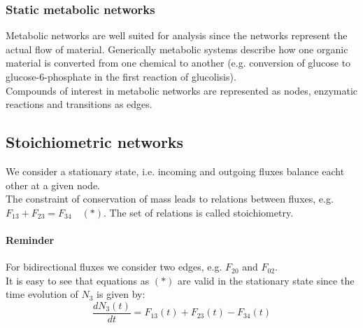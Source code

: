 \subsubsection{Static metabolic networks}
Metabolic networks are well suited for analysis since the networks represent the actual flow of material. Generically metabolic systems describe how one organic material is converted from one chemical to another (e.g. conversion of glucose to glucose-6-phosphate in the first reaction of glucolisis).\\
Compounds of interest in metabolic networks are represented as nodes, enzymatic reactions and transitions as edges.
\subsection{Stoichiometric networks}
\begin{figure}[H]
\end{figure}
We consider a stationary state, i.e. incoming and outgoing fluxes balance eacht other at a given node.\\
The constraint of conservation of mass leads to relations between fluxes, e.g. $F_{13}+F_{23}=F_{34}\quad (\ast)$. The set of relations is called stoichiometry.\\
\paragraph{Reminder} For bidirectional fluxes we consider two edges, e.g. $F_{20}$ and $F_{02}$.\\
It is easy to see that equations as $(\ast)$ are valid in the stationary state since the time evolution of $N_3$ is given by:
\begin{equation*}
\frac{dN_3(t)}{dt}=F_{13}(t)+F_{23}(t)-F_{34}(t)
\end{equation*}
